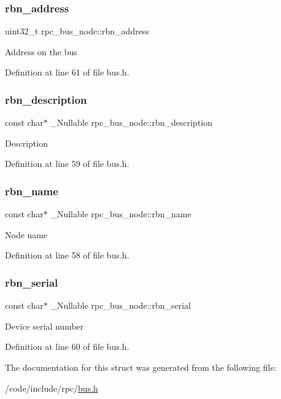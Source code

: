 \subsubsection{\texorpdfstring{rbn\+\_\+address}{rbn\_address}}
{\footnotesize\ttfamily uint32\+\_\+t rpc\+\_\+bus\+\_\+node\+::rbn\+\_\+address}

Address on the bus 

Definition at line 61 of file bus.\+h.

\mbox{\label{structrpc__bus__node_af5d23beee7c50520e7235f0c922fafb1}} 
\subsubsection{\texorpdfstring{rbn\+\_\+description}{rbn\_description}}
{\footnotesize\ttfamily const char$\ast$ \+\_\+\+Nullable rpc\+\_\+bus\+\_\+node\+::rbn\+\_\+description}

Description 

Definition at line 59 of file bus.\+h.

\mbox{\label{structrpc__bus__node_a9afbf9a155ae01c1c47dc210a8334022}} 
\subsubsection{\texorpdfstring{rbn\+\_\+name}{rbn\_name}}
{\footnotesize\ttfamily const char$\ast$ \+\_\+\+Nullable rpc\+\_\+bus\+\_\+node\+::rbn\+\_\+name}

Node name 

Definition at line 58 of file bus.\+h.

\mbox{\label{structrpc__bus__node_a885b358a61a0b459d86d7c534be6ef0f}} 
\subsubsection{\texorpdfstring{rbn\+\_\+serial}{rbn\_serial}}
{\footnotesize\ttfamily const char$\ast$ \+\_\+\+Nullable rpc\+\_\+bus\+\_\+node\+::rbn\+\_\+serial}

Device serial number 

Definition at line 60 of file bus.\+h.



The documentation for this struct was generated from the following file\+:\begin{DoxyCompactItemize}
\item 
/code/include/rpc/\hyperlink{bus_8h}{bus.\+h}\end{DoxyCompactItemize}
